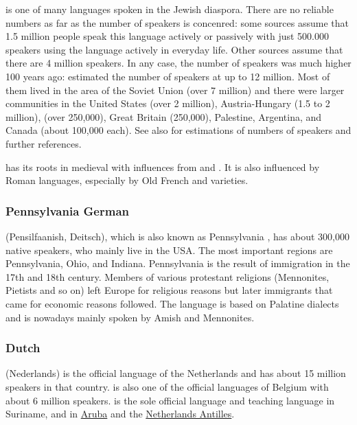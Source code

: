  is one of many languages spoken in the Jewish diaspora. There are no reliable numbers
as far as the number of speakers is concenred: some sources assume that
1.5 million people speak this language actively or passively with just 500.000 speakers using the language
actively in everyday life. Other sources assume that there are 4 million
speakers. In any case, the number of  speakers was much
higher 100 years ago: \citet[]{Birnbaum1915a-u} estimated the number of speakers at up to 12 million. Most of
them lived in the area of the Soviet Union (over 7 million) and there were larger communities in the United States (over 2 million), Austria-Hungary
(1.5 to 2 million),  (over 250,000), Great Britain
(250,000), Palestine, Argentina, and Canada (about 100,000 each). See also  for
estimations of numbers of speakers and further references.

 has its roots
in medieval  with influences from  and . It is also influenced by
Roman languages, especially by Old French and  varieties.


\subsubsection{Pennsylvania German}

 (Pensilfaanish, Deitsch), which is also known as Pennsylvania , has about 300,000
native speakers, who mainly live in the USA. The most important regions are Pennsylvania, Ohio, and
Indiana. Pennsylvania  is the result of immigration in the 17th and 18th century. Members of
various protestant religions (Mennonites, Pietists and so on) left Europe for religious reasons  
but later immigrants that came for economic reasons followed.  The language is
based on Palatine dialects and is nowadays mainly spoken by Amish and Mennonites.




\subsubsection{Dutch}

 (Nederlands) is the  official language of the Netherlands and has about 15 million speakers in that country.  is also one of the official languages of Belgium with about 6 million speakers.
 is the sole official language and teaching language in Suriname, 
and in \href{https://en.wikipedia.org/wiki/Aruba}{Aruba} and the \href{https://en.wikipedia.org/wiki/Netherlands_Antilles}{Netherlands Antilles}.

